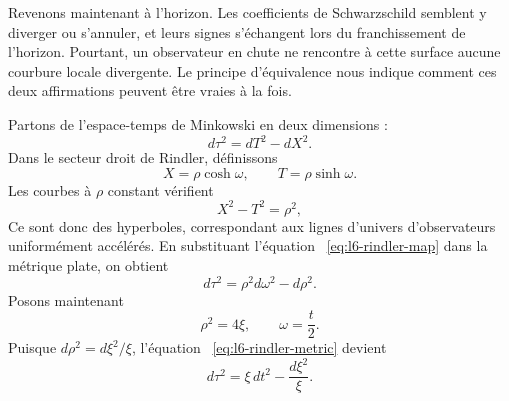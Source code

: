 Revenons maintenant à l’horizon. Les coefficients de Schwarzschild semblent y diverger ou s’annuler, et leurs signes s’échangent lors du franchissement de l’horizon. Pourtant, un observateur en chute ne rencontre à cette surface aucune courbure locale divergente. Le principe d’équivalence nous indique comment ces deux affirmations peuvent être vraies à la fois.

Partons de l’espace-temps de Minkowski en deux dimensions :
\begin{equation}
d\tau^{2}=dT^{2}-dX^{2}.
\end{equation}
Dans le secteur droit de Rindler, définissons
\begin{equation}
X=\rho\cosh\omega,
\qquad
T=\rho\sinh\omega.
\label{eq:l6-rindler-map}
\end{equation}
Les courbes à \(\rho\) constant vérifient
\begin{equation}
X^{2}-T^{2}=\rho^{2},
\end{equation}
Ce sont donc des hyperboles, correspondant aux lignes d’univers d’observateurs uniformément accélérés. En substituant l’équation ~\eqref{eq:l6-rindler-map} dans la métrique plate, on obtient
\begin{equation}
d\tau^{2}
=\rho^{2}d\omega^{2}-d\rho^{2}.
\label{eq:l6-rindler-metric}
\end{equation}
Posons maintenant
\begin{equation}
\rho^{2}=4\xi,
\qquad
\omega=\frac{t}{2}.
\label{eq:l6-rindler-rescale}
\end{equation}
Puisque \(d\rho^{2}=d\xi^{2}/\xi\), l’équation ~\eqref{eq:l6-rindler-metric} devient
\begin{equation}
d\tau^{2}
=\xi\,dt^{2}-\frac{d\xi^{2}}{\xi}.
\label{eq:l6-xi-metric}
\end{equation}

\begin{classroomqa}
\end{classroomqa}

